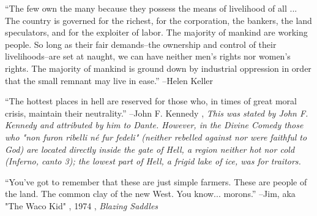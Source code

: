 \documentclass{article}%
\begin{document}
\linebreak%
\vspace{1mm}%
\begin{minipage}{\textwidth}%
\flushleft%
“The few own the many because they possess the means of livelihood of all ... The country is governed for the richest, for the corporation, the bankers, the land speculators, and for the exploiter of labor. The majority of mankind are working people. So long as their fair demands–the ownership and control of their livelihoods–are set at naught, we can have neither men's rights nor women's rights. The majority of mankind is ground down by industrial oppression in order that the small remnant may live in ease.”%
\linebreak%
\vspace{1mm}%
–Helen Keller%
\linebreak%
\vspace{1mm}%
\end{minipage}%
\linebreak%
\vspace{1mm}%
\begin{minipage}{\textwidth}%
\flushleft%
“The hottest places in hell are reserved for those who, in times of great moral crisis, maintain their neutrality.”%
\linebreak%
\vspace{1mm}%
–John F. Kennedy%
, \textit{This was stated by John F. Kennedy and attributed by him to Dante. However, in the Divine Comedy those who "non furon ribelli né fur fedeli" (neither rebelled against nor were faithful to God) are located directly inside the gate of Hell, a region neither hot nor cold (Inferno, canto 3); the lowest part of Hell, a frigid lake of ice, was for traitors.}%
\linebreak%
\vspace{1mm}%
\end{minipage}%
\linebreak%
\vspace{1mm}%
\begin{minipage}{\textwidth}%
\flushleft%
“You've got to remember that these are just simple farmers. These are people of the land. The common clay of the new West. You know... morons.”%
\linebreak%
\vspace{1mm}%
–Jim, aka "The Waco Kid"%
, 1974%
, \textit{Blazing Saddles}%
\linebreak%
\vspace{1mm}%
\end{minipage}%
\end{document}
